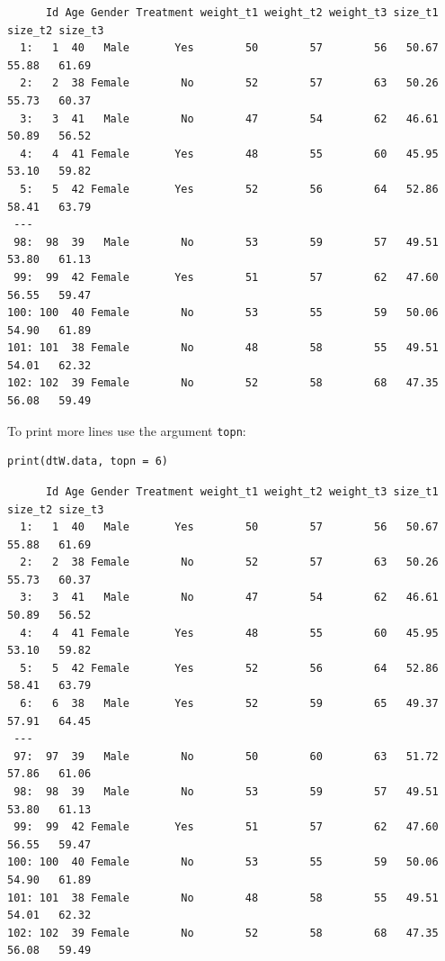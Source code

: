 \documentclass{article}
\begin{document}
\begin{verbatim}
      Id Age Gender Treatment weight_t1 weight_t2 weight_t3 size_t1 size_t2 size_t3
  1:   1  40   Male       Yes        50        57        56   50.67   55.88   61.69
  2:   2  38 Female        No        52        57        63   50.26   55.73   60.37
  3:   3  41   Male        No        47        54        62   46.61   50.89   56.52
  4:   4  41 Female       Yes        48        55        60   45.95   53.10   59.82
  5:   5  42 Female       Yes        52        56        64   52.86   58.41   63.79
 ---                                                                               
 98:  98  39   Male        No        53        59        57   49.51   53.80   61.13
 99:  99  42 Female       Yes        51        57        62   47.60   56.55   59.47
100: 100  40 Female        No        53        55        59   50.06   54.90   61.89
101: 101  38 Female        No        48        58        55   49.51   54.01   62.32
102: 102  39 Female        No        52        58        68   47.35   56.08   59.49
\end{verbatim}

To print more lines use the argument \texttt{topn}:
\lstset{language=r,label= ,caption= ,captionpos=b,numbers=none}
\begin{lstlisting}
print(dtW.data, topn = 6)
\end{lstlisting}

\begin{verbatim}
      Id Age Gender Treatment weight_t1 weight_t2 weight_t3 size_t1 size_t2 size_t3
  1:   1  40   Male       Yes        50        57        56   50.67   55.88   61.69
  2:   2  38 Female        No        52        57        63   50.26   55.73   60.37
  3:   3  41   Male        No        47        54        62   46.61   50.89   56.52
  4:   4  41 Female       Yes        48        55        60   45.95   53.10   59.82
  5:   5  42 Female       Yes        52        56        64   52.86   58.41   63.79
  6:   6  38   Male       Yes        52        59        65   49.37   57.91   64.45
 ---                                                                               
 97:  97  39   Male        No        50        60        63   51.72   57.86   61.06
 98:  98  39   Male        No        53        59        57   49.51   53.80   61.13
 99:  99  42 Female       Yes        51        57        62   47.60   56.55   59.47
100: 100  40 Female        No        53        55        59   50.06   54.90   61.89
101: 101  38 Female        No        48        58        55   49.51   54.01   62.32
102: 102  39 Female        No        52        58        68   47.35   56.08   59.49
\end{verbatim}
\end{document}
